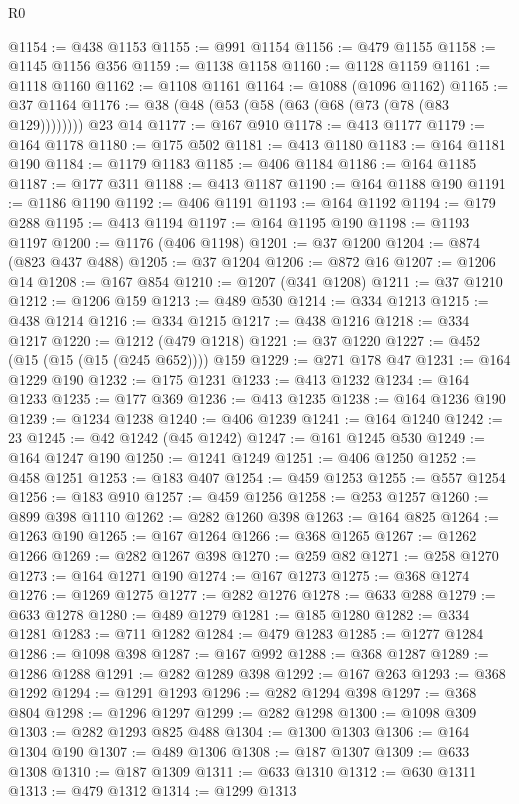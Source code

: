 \begin{lexlean}{R0}
\begin{coremodule}
@1154 := @438 @1153
@1155 := @991 @1154
@1156 := @479 @1155
@1158 := @1145 @1156 @356
@1159 := @1138 @1158
@1160 := @1128 @1159
@1161 := @1118 @1160
@1162 := @1108 @1161
@1164 := @1088 (@1096 @1162)
@1165 := @37 @1164
@1176 := @38 (@48 (@53 (@58 (@63 (@68 (@73 (@78 (@83 @129)))))))) @23 @14
@1177 := @167 @910
@1178 := @413 @1177
@1179 := @164 @1178
@1180 := @175 @502
@1181 := @413 @1180
@1183 := @164 @1181 @190
@1184 := @1179 @1183
@1185 := @406 @1184
@1186 := @164 @1185
@1187 := @177 @311
@1188 := @413 @1187
@1190 := @164 @1188 @190
@1191 := @1186 @1190
@1192 := @406 @1191
@1193 := @164 @1192
@1194 := @179 @288
@1195 := @413 @1194
@1197 := @164 @1195 @190
@1198 := @1193 @1197
@1200 := @1176 (@406 @1198)
@1201 := @37 @1200
@1204 := @874 (@823 @437 @488)
@1205 := @37 @1204
@1206 := @872 @16
@1207 := @1206 @14
@1208 := @167 @854
@1210 := @1207 (@341 @1208)
@1211 := @37 @1210
@1212 := @1206 @159
@1213 := @489 @530
@1214 := @334 @1213
@1215 := @438 @1214
@1216 := @334 @1215
@1217 := @438 @1216
@1218 := @334 @1217
@1220 := @1212 (@479 @1218)
@1221 := @37 @1220
@1227 := @452 (@15 (@15 (@15 (@245 @652)))) @159
@1229 := @271 @178 @47
@1231 := @164 @1229 @190
@1232 := @175 @1231
@1233 := @413 @1232
@1234 := @164 @1233
@1235 := @177 @369
@1236 := @413 @1235
@1238 := @164 @1236 @190
@1239 := @1234 @1238
@1240 := @406 @1239
@1241 := @164 @1240
@1242 := 23
@1245 := @42 @1242 (@45 @1242)
@1247 := @161 @1245 @530
@1249 := @164 @1247 @190
@1250 := @1241 @1249
@1251 := @406 @1250
@1252 := @458 @1251
@1253 := @183 @407
@1254 := @459 @1253
@1255 := @557 @1254
@1256 := @183 @910
@1257 := @459 @1256
@1258 := @253 @1257
@1260 := @899 @398 @1110
@1262 := @282 @1260 @398
@1263 := @164 @825
@1264 := @1263 @190
@1265 := @167 @1264
@1266 := @368 @1265
@1267 := @1262 @1266
@1269 := @282 @1267 @398
@1270 := @259 @82
@1271 := @258 @1270
@1273 := @164 @1271 @190
@1274 := @167 @1273
@1275 := @368 @1274
@1276 := @1269 @1275
@1277 := @282 @1276
@1278 := @633 @288
@1279 := @633 @1278
@1280 := @489 @1279
@1281 := @185 @1280
@1282 := @334 @1281
@1283 := @711 @1282
@1284 := @479 @1283
@1285 := @1277 @1284
@1286 := @1098 @398
@1287 := @167 @992
@1288 := @368 @1287
@1289 := @1286 @1288
@1291 := @282 @1289 @398
@1292 := @167 @263
@1293 := @368 @1292
@1294 := @1291 @1293
@1296 := @282 @1294 @398
@1297 := @368 @804
@1298 := @1296 @1297
@1299 := @282 @1298
@1300 := @1098 @309
@1303 := @282 @1293 @825 @488
@1304 := @1300 @1303
@1306 := @164 @1304 @190
@1307 := @489 @1306
@1308 := @187 @1307
@1309 := @633 @1308
@1310 := @187 @1309
@1311 := @633 @1310
@1312 := @630 @1311
@1313 := @479 @1312
@1314 := @1299 @1313

\end{coremodule}
\end{lexlean}
